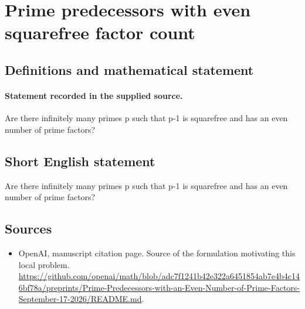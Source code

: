 \documentclass[11pt]{article}
\begin{document}
\section*{Prime predecessors with even squarefree factor count}\label{statement}
\subsection{Definitions and mathematical statement}
\paragraph{Statement recorded in the supplied source.}
Are there infinitely many primes p such that p-1 is squarefree and has an even number of prime factors?
\subsection{Short English statement}
Are there infinitely many primes p such that p-1 is squarefree and has an even number of prime factors?
\subsection{Sources}
\begin{itemize}
\item[S1] OpenAI, manuscript citation page. Source of the formulation motivating this local problem.
\url{https://github.com/openai/math/blob/adc7f1241b42e322a6451854ab7e4b4c146bf78a/preprints/Prime-Predecessors-with-an-Even-Number-of-Prime-Factors-September-17-2026/README.md}.
\end{itemize}
\end{document}

